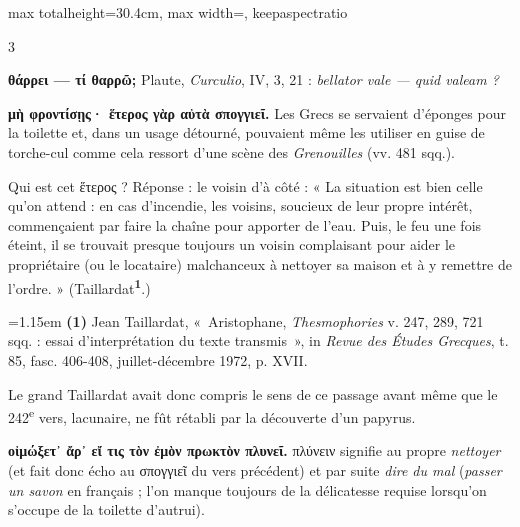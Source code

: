 \documentclass[11pt,twoside]{book}
\newcommand{\italique}[1]{\textit{#1}}
\newcommand{\nieme}[1]{#1\textsuperscript{e}}
\newcommand{\latin}[1]{\textit{#1}}
\newcommand{\marqueur}[1]{\textsuperscript{\color{rubricRed}\textbf{#1}}}
\begin{document}
\begin{adjustbox}{max totalheight=30.4cm, max width=\textwidth, keepaspectratio}
\begin{minipage}{\textwidth}
{\begin{multicols}{3}
\par\vspace{1.5pt}
 \textbf{θάρρει — τί θαρρῶ;} Plaute, \italique{Curculio}, IV, 3, 21 : \latin{bellator vale — quid valeam ?}
\par\vspace{1.5pt}
 \textbf{μὴ φροντίσῃς· ἕτερος γὰρ αὐτὰ σπογγιεῖ.} Les Grecs se servaient d'éponges pour la toilette et, dans un usage détourné, pouvaient même les utiliser en guise de torche-cul comme cela ressort d'une scène des \italique{Grenouilles} (vv. 481 sqq.).
\par\vspace{1.5pt}
\noindent Qui est cet ἕτερος ? Réponse : le voisin d'à côté : « La situation est bien celle qu'on attend : en cas d'incendie, les voisins, soucieux de leur propre intérêt, commençaient par faire la chaîne pour apporter de l'eau. Puis, le feu une fois éteint, il se trouvait presque toujours un voisin complaisant pour aider le propriétaire (ou le locataire) malchanceux à nettoyer sa maison et à y remettre de l'ordre. » (Taillardat\marqueur{1}.)
\par\vspace{1.5pt}
\par\vspace{1.2pt}\par\nopagebreak\vspace{1pt}\noindent\hangindent=1.15em {\color{sepiaNote}\textbf{(1)}} Jean Taillardat, «~Aristophane, \italique{Thesmophories} v. 247, 289, 721 sqq. : essai d'interprétation du texte transmis~», in \italique{Revue des Études Grecques}, t. 85, fasc. 406-408, juillet-décembre 1972, p. XVII.
\par\vspace{1.5pt}
\noindent Le grand Taillardat avait donc compris le sens de ce passage avant même que le \nieme{242} vers, lacunaire, ne fût rétabli par la découverte d'un papyrus.
\par\vspace{1.5pt}
 \textbf{οἰμώξετ᾽ ἄρ᾽ εἴ τις τὸν ἐμὸν πρωκτὸν πλυνεῖ.} πλύνειν signifie au propre \italique{nettoyer} (et fait donc écho au σπογγιεῖ du vers précédent) et par suite \italique{dire du mal} (\italique{passer un savon} en français ; l'on manque toujours de la délicatesse requise lorsqu'on s'occupe de la toilette d'autrui).

\end{multicols}}
\end{minipage}
\end{adjustbox}
\end{document}

